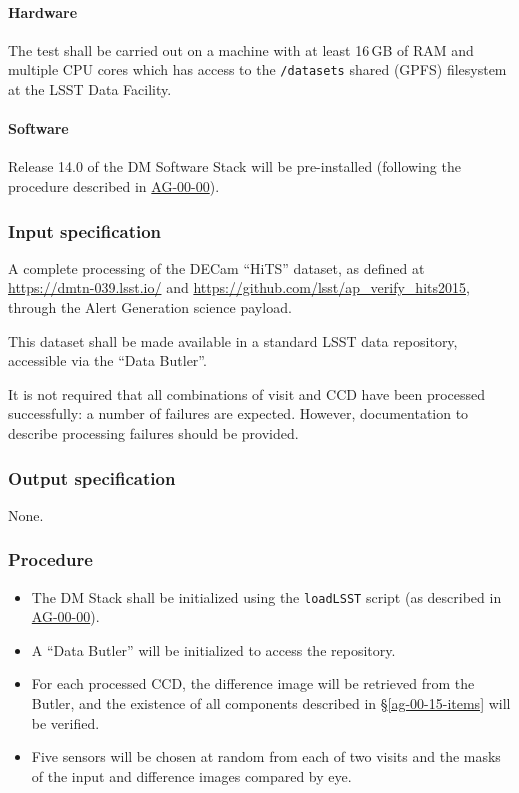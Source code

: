 \paragraph{Hardware}

The test shall be carried out on a machine with at least 16\,GB of RAM and
multiple CPU cores which has access to the \texttt{/datasets} shared (GPFS)
filesystem at the LSST Data Facility.

\paragraph{Software}

Release 14.0 of the DM Software Stack will be pre-installed (following the
procedure described in \hyperref[ag-00-00]{AG-00-00}).

\subsubsection{Input specification}

A complete processing of the DECam ``HiTS'' dataset, as defined at
\url{https://dmtn-039.lsst.io/} and
\url{https://github.com/lsst/ap_verify_hits2015}, through the Alert
Generation science payload.

This dataset shall be made available in a standard LSST data repository,
accessible via the ``Data Butler''.

It is not required that all combinations of visit and CCD have been processed
successfully: a number of failures are expected. However, documentation to
describe processing failures should be provided.

\subsubsection{Output specification}

None.

\subsubsection{Procedure}

\begin{itemize}

  \item{The DM Stack shall be initialized using the \texttt{loadLSST} script
  (as described in \hyperref[ag-00-00]{AG-00-00}).}

  \item{A ``Data Butler'' will be initialized to access the repository.}

  \item{For each processed CCD, the difference image 
	  will be retrieved from the Butler, and
  the existence of all components described in \S\ref{ag-00-15-items} will be
  verified.}

  \item{Five sensors will be chosen at random from each of two visits and the masks of the input and difference images compared by eye.}

\end{itemize}
